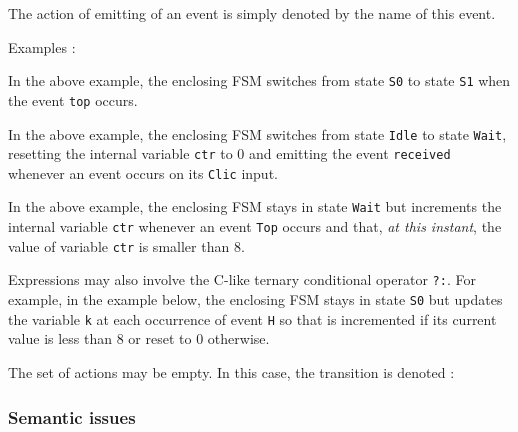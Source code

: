 \medskip
The action of emitting of an event  is simply denoted by the name of this event.

\medskip
Examples :

\begin{center}
\end{center}

In the above example, the enclosing FSM switches from state \verb|S0| to state \verb|S1| when the
event \verb|top| occurs. 

\begin{center}
\end{center}

In the above example, the enclosing FSM switches from state \verb|Idle| to state \verb|Wait|, resetting the internal variable
  \verb|ctr| to 0 and emitting the event \verb|received| whenever an event occurs on its \verb|Clic| input.

\begin{center}
\end{center}

In the above example, the enclosing FSM stays in state \verb|Wait| but increments the internal
variable \verb|ctr| whenever an event \verb|Top| occurs and that, \emph{at this instant}, the
value of variable \verb|ctr| is smaller than 8. 

\medskip
Expressions may also involve the C-like ternary conditional operator \verb|?:|.
For example, in the example below, the enclosing FSM stays in state \verb|S0| but updates the variable \verb|k|
at each occurrence of event \verb|H| so that is incremented if its current value is less than 8 or
reset to 0 otherwise.

\begin{center}
\end{center}

\medskip
The set of actions may be empty. In this case, the transition is denoted :

\begin{center}
\end{center}

\subsubsection*{Semantic issues}
\label{sec:semantic-issues}

